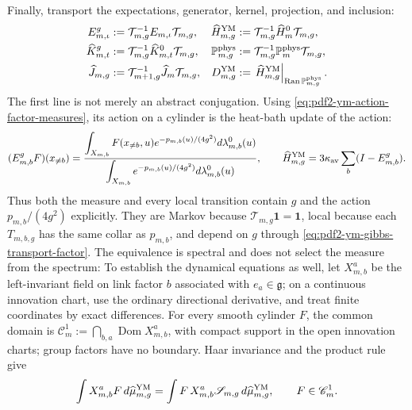 Finally, transport the expectations, generator, kernel, projection, and inclusion:
\begin{equation}\label{eq:pdf2-ym-g-dynamics}
 \begin{aligned}
 E_{m,\iota}^{g}&:=\mathcal T_{m,g}^{-1}E_{m,\iota}\mathcal T_{m,g},&
 \widehat H_{m,g}^{\rm YM}&:=\mathcal T_{m,g}^{-1}\widehat H_m^0\mathcal T_{m,g},\\
 \widehat K_{m,t}^{g}&:=\mathcal T_{m,g}^{-1}\widehat K_{m,t}^{0}\mathcal T_{m,g},&
 \mathbb P_{m,g}^{\rm phys}&:=\mathcal T_{m,g}^{-1}
     \mathbb P_m^{\rm phys}\mathcal T_{m,g},\\
 \widehat J_{m,g}&:=\mathcal T_{m+1,g}^{-1}
     \widehat J_m\mathcal T_{m,g},&
 D_{m,g}^{\rm YM}&:=\left.\widehat H_{m,g}^{\rm YM}
     \right|_{\operatorname{Ran}\mathbb P_{m,g}^{\rm phys}}.
 \end{aligned}
\end{equation}
The first line is not merely an abstract conjugation. Using
\eqref{eq:pdf2-ym-action-factor-measures}, its action on a cylinder is the
heat-bath update of the action:
\begin{equation}\label{eq:pdf2-ym-gibbs-conditional-expectation}
 (E_{m,b}^{g}F)(x_{\ne b})
 =\frac{\displaystyle
   \int_{X_{m,b}}F(x_{\ne b},u)e^{-p_{m,b}(u)/(4g^2)}
       d\lambda_{m,b}^0(u)}{\displaystyle
   \int_{X_{m,b}}e^{-p_{m,b}(u)/(4g^2)}d\lambda_{m,b}^0(u)},
 \qquad
 \widehat H_{m,g}^{\rm YM}
 =3\kappa_{\rm av}\sum_b(I-E_{m,b}^{g}).
\end{equation}
Thus both the measure and every local transition contain $g$ and the action
$p_{m,b}/(4g^2)$ explicitly.
They are Markov because $\mathcal T_{m,g}\mathbf1=\mathbf1$, local because each
$T_{m,b,g}$ has the same collar as $p_{m,b}$, and depend on $g$ through
\eqref{eq:pdf2-ym-gibbs-transport-factor}. The equivalence is spectral and does not
select the measure from the spectrum:
To establish the dynamical equations as well, let $X_{m,b}^a$ be the
left-invariant field on link factor $b$ associated with
$e_a\in\mathfrak g$; on a continuous innovation chart, use the ordinary
directional derivative, and treat finite coordinates by exact differences.
For every smooth cylinder $F$, the common domain is
$\mathscr C_m^1:=\bigcap_{b,a}\operatorname{Dom}X_{m,b}^a$, with compact
support in the open innovation charts; group factors have no
boundary. Haar invariance and the product rule give
\begin{equation}\label{eq:pdf2-ym-schwinger-dyson-finite}
 \int X_{m,b}^aF\,d\widehat\mu_{m,g}^{\rm YM}
 =\int F\,X_{m,b}^a\mathscr S_{m,g}\,d\widehat\mu_{m,g}^{\rm YM},
 \qquad F\in\mathscr C_m^1.
\end{equation}
